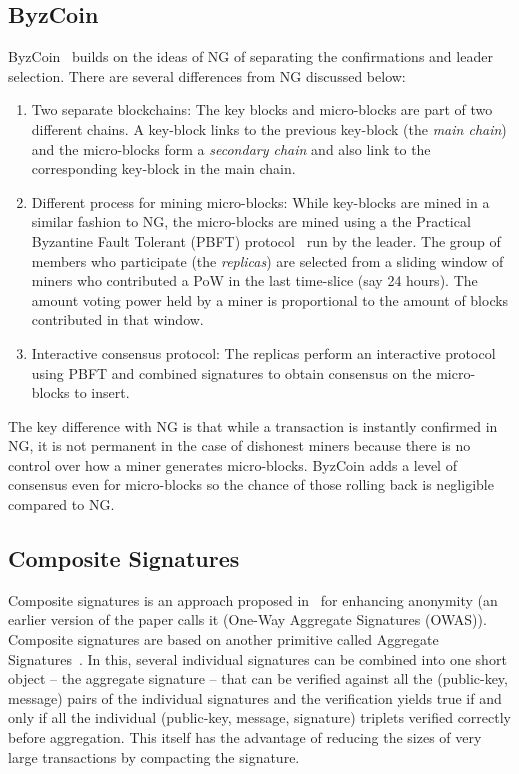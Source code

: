 \documentclass[]{report}   %
\begin{document}
\subsection{ByzCoin}

ByzCoin~\cite{kokorisposter} builds on the ideas of NG of separating the confirmations and leader selection. There are several differences from NG discussed below:
\begin{enumerate}
	\item Two separate blockchains: The key blocks and micro-blocks are part of two different chains. A key-block links to the previous key-block (the {\em main chain}) and the micro-blocks form a {\em secondary chain} and also link to the corresponding key-block in the main chain. 
	\item Different process for mining micro-blocks: While key-blocks are mined in a similar fashion to NG, the micro-blocks are mined using a the Practical Byzantine Fault Tolerant (PBFT) protocol~\cite{castro1999practical} run by the leader. The group of members who participate (the {\em replicas}) are selected from a sliding window of miners who contributed a PoW in the last time-slice (say 24 hours). The amount voting power held by a miner is proportional to the amount of blocks contributed in that window.
	\item Interactive consensus protocol: The replicas perform an interactive protocol using PBFT and combined signatures to obtain consensus on the micro-blocks to insert.
\end{enumerate}

The key difference with NG is that while a transaction is instantly confirmed in NG, it is not permanent in the case of dishonest miners because there is no control over how a miner generates micro-blocks. ByzCoin adds a level of consensus even for micro-blocks so the chance of those rolling back is negligible compared to NG.

\subsection{Composite Signatures}

Composite signatures is an approach proposed in~\cite{saxena2014increasing} for enhancing anonymity (an earlier version of the paper calls it (One-Way Aggregate Signatures (OWAS)). Composite signatures are based on another primitive called Aggregate Signatures~\cite{boneh2003aggregate}. In this, several individual signatures can be combined into one short object -- the aggregate signature -- that can be verified against all the (public-key, message) pairs of the individual signatures and the verification yields true if and only if all the individual (public-key, message, signature) triplets verified correctly before aggregation. This itself has the advantage of reducing the sizes of very large transactions by compacting the signature. 
\end{document}
